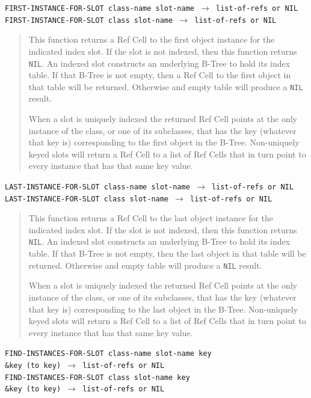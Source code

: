 \documentclass[article,oneside]{memoir}
\begin{document}
\noindent \texttt{FIRST-INSTANCE-FOR-SLOT class-name slot-name $\rightarrow$ list-of-refs or NIL}\\
\noindent \texttt{FIRST-INSTANCE-FOR-SLOT class slot-name $\rightarrow$  list-of-refs or NIL}

\begin{quote}
This function returns a Ref Cell to the first object instance for the indicated index slot. If the slot is not indexed, then this function returns \texttt{NIL}. An indexed slot constructs an underlying B-Tree to hold its index table. If that B-Tree is not empty, then a Ref Cell to the first object in that table will be returned. Otherwise and empty table will produce a \texttt{NIL} result.

When a slot is uniquely indexed the returned Ref Cell points at the only instance of the class, or one of its subclasses, that has the key (whatever that key is) corresponding to the first object in the B-Tree. Non-uniquely keyed slots will return a Ref Cell to a list of Ref Cells that in turn point to every instance that has that same key value.
\end{quote}

\noindent \texttt{LAST-INSTANCE-FOR-SLOT class-name slot-name $\rightarrow$ list-of-refs or NIL}\\
\noindent \texttt{LAST-INSTANCE-FOR-SLOT class slot-name $\rightarrow$  list-of-refs or NIL}

\begin{quote}
This function returns a Ref Cell to the last object instance for the indicated index slot. If the slot is not indexed, then this function returns \texttt{NIL}. An indexed slot constructs an underlying B-Tree to hold its index table. If that B-Tree is not empty, then the last object in that table will be returned. Otherwise and empty table will produce a \texttt{NIL} result.

When a slot is uniquely indexed the returned Ref Cell points at the only instance of the class, or one of its subclasses, that has the key (whatever that key is) corresponding to the last object in the B-Tree. Non-uniquely keyed slots will return a Ref Cell to a list of Ref Cells that in turn point to every instance that has that same key value.
\end{quote}

\noindent \texttt{FIND-INSTANCES-FOR-SLOT class-name slot-name key \\ \hspace*{10em} \&key (to key) $\rightarrow$ list-of-refs or NIL}\\
\noindent \texttt{FIND-INSTANCES-FOR-SLOT class slot-name key \\ \hspace*{10em} \&key (to key) $\rightarrow$ list-of-refs or NIL}
\end{document}
